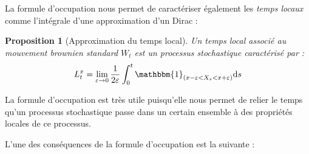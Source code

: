 \documentclass[openany]{book}
\makeatletter
\newcommand{\R}{\mathbb{R}}
\newcommand{\1}{\mathbbm{1}}
\renewcommand{\d}{\mathrm{d}}
\renewenvironment{proof}[1][\textbf{\textit{Démonstration}}]{%
  \par\pushQED{\qed}%
  \normalfont\topsep6\p@\@plus6\p@\relax
  \trivlist\item[\hskip\labelsep
    #1\@addpunct{.}]\ignorespaces
}{%
  \popQED\endtrivlist\@endpefalse
}
\theoremstyle{thmfont}
\newtheorem{theorem}{Théorème}[chapter]
\theoremstyle{deffont}
\theoremstyle{thmfont}
\newtheorem{prop}[prop]{Proposition}
\theoremstyle{deffont}
\makeatother
\begin{document}
La formule d'occupation nous permet de caractériser également les \textit{temps locaux} comme l'intégrale d'une approximation d'un Dirac :

%
%

\begin{prop}[Approximation du temps local]
  \label{prop:caractTempsLoc}
  Un \textit{temps local} associé au mouvement brownien standard $W_t$ est un processus stochastique caractérisé par :
\begin{equation*}
  L_t^x = \lim_{\varepsilon \to 0} \frac{1}{2\varepsilon} \int_0^t \1_{(x - \varepsilon < X_s < x + \varepsilon)} \d s
\end{equation*}
\end{prop}

La formule d'occupation est très utile puisqu'elle nous permet de relier le temps qu’un processus stochastique passe dans un certain ensemble à des propriétés locales de ce processus.

L'une des conséquences de la formule d'occupation est la suivante :
\end{document}
